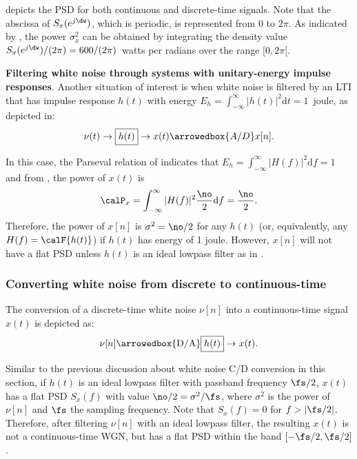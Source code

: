  depicts the PSD for both continuous and discrete-time signals. Note that the abscissa of $S_x(e^{j \dw})$, which is periodic, is represented from 0 to $2 \pi$. As indicated by , the power $\sigma_x^2$ can be obtained by integrating the density value $S_x(e^{j \dw})/(2 \pi) = 600/(2 \pi)$~watts per radians over the range $[0, 2\pi[$.
\eExample

\bExample \textbf{Filtering white noise through systems with unitary-energy impulse responses}.
\label{ex:discretizingWhiteNoiseViaUnitaryEnergy}
Another situation of interest is when white noise is filtered by an LTI that
has impulse response $h(t)$ with energy $E_h=\int_{-\infty}^{\infty} |h(t)|^2 \textrm{d}t = 1$~joule, as depicted in:
\begin{align*}
\nu(t) \rightarrow \fbox{$h(t)$} \rightarrow x(t) \arrowedbox{A/D}  x[n].
\end{align*}

In this case, the Parseval relation of  indicates that 
$E_h=\int_{-\infty}^{\infty} |H(f)|^2 \textrm{d}f = 1$
and from , the power of $x(t)$ is
\begin{equation}
\calP_x = \int_{-\infty}^{\infty} |H(f)|^2 \frac{\no}{2} \textrm{d}f = \frac{\no}{2}.
\label{eq:discretizingWhiteNoiseViaUnitaryEnergy}
\end{equation}
Therefore, the power of $x[n]$ is $\sigma^2 = \no/2$ for any $h(t)$ (or, equivalently, any $H(f) = \calF \{ h(t) \}$)
if $h(t)$ has energy of 1 joule. However, $x[n]$ will not have a flat PSD unless
$h(t)$ is an ideal lowpass filter as in .
\eExample

\subsubsection{Converting white noise from discrete to continuous-time}

The conversion of a discrete-time white noise $\nu[n]$ into a continuous-time signal $x(t)$ is depicted as:
\begin{align*}
\nu[n] \arrowedbox{ \textrm{D/A} } \fbox{$h(t)$} \rightarrow x(t) .
\end{align*}

Similar to the previous discussion about white noise C/D conversion in this section,
if $h(t)$ is an ideal lowpass
filter with passband frequency $\fs/2$, $x(t)$ has a flat PSD $S_x(f)$ with value $\no/2 = \sigma^2 / \fs$, where $\sigma^2$ is the
power of $\nu[n]$ and $\fs$ the sampling frequency. Note that $S_x(f)=0$ 
for $f > |\fs/2|$. Therefore, after filtering $\nu[n]$ with an ideal lowpass filter, the resulting $x(t)$ is not a continuous-time WGN, but has a flat PSD within the
band $[-\fs/2,\fs/2]$.

